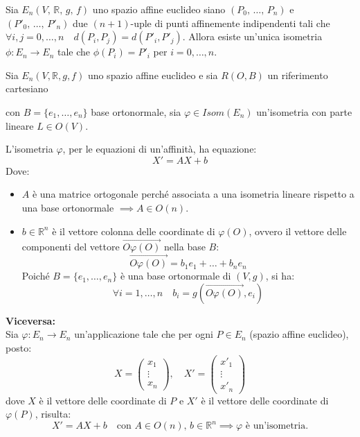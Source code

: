         \begin{richiamo}
        \label{richiamo:teorema_esistenza_unicita_isometrie}
        \mbox{}
            
        Sia $E_n \left(V , \, \mathbb{R}, \, g, \, f \right)$ uno spazio affine euclideo siano $\left(P_0, \, \dots, \, P_n\right)$ e $\left(P'_0, \, \dots, \, P'_n\right)$ 
        due $(n+1)$-uple di punti affinemente indipendenti tali che $\forall i , j=0,\ldots,n \quad d(P_i,P_j) = d(P'_i,P'_j)$.
        Allora esiste un'unica isometria $\phi: E_n \to E_n$ tale che $\phi(P_i) = P'_i$ per $i=0,\ldots,n$.
        \end{richiamo}
        \begin{richiamo}
        \mbox{}

        Sia $E_n(V, \mathbb{R}, g, f)$ uno spazio affine euclideo e sia $R(O, B)$ un riferimento cartesiano 
        
        con $B = \{e_1, \dots, e_n\}$ base ortonormale, sia $\varphi \in Isom(E_n)$ un'isometria con parte lineare $L \in O(V)$.

        L'isometria $\varphi$, per le equazioni di un'affinità, ha equazione:
        \[
        X' = AX + b
        \]
        Dove:
        \begin{itemize}
            \item $A$ è una matrice ortogonale perché associata a una isometria lineare rispetto a una base ortonormale $\implies A \in O(n)$.
            \item $b \in \mathbb{R}^n$ è il vettore colonna delle coordinate di $\varphi(O)$, ovvero il vettore delle componenti del vettore $\overrightarrow{O\varphi(O)}$ nella base $B$:
            \[
            \overrightarrow{O\varphi(O)} = b_1 e_1 + \dots + b_n e_n
            \]
            Poiché $B = \{e_1, \dots, e_n\}$ è una base ortonormale di $(V,g)$, si ha:
            \[
            \forall i = 1, \dots, n \quad b_i = g(\overrightarrow{O\varphi(O)}, e_i)
            \]
        \end{itemize}

        \textbf{Viceversa:} \\
        Sia $\varphi: E_n \to E_n$ un'applicazione tale che per ogni $P \in E_n$ (spazio affine euclideo), posto:
        \[
        X = \begin{pmatrix} x_1 \\ \vdots \\ x_n \end{pmatrix}, \quad X' = \begin{pmatrix} x'_1 \\ \vdots \\ x'_n \end{pmatrix}
        \]
        dove $X$ è il vettore delle coordinate di $P$ e $X'$ è il vettore delle coordinate di $\varphi(P)$, risulta:
        \[
        X' = AX + b \quad \text{con } A \in O(n), \, b \in \mathbb{R}^n \implies \varphi \text{ è un'isometria.}
        \]
        \end{richiamo}
